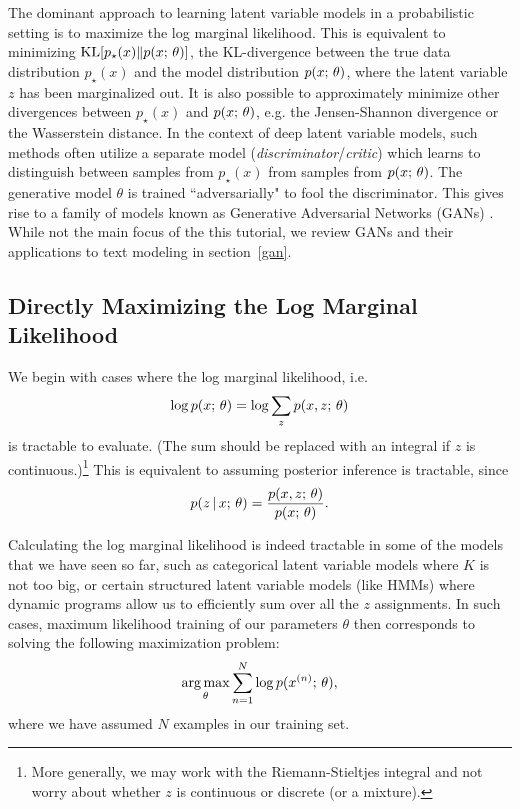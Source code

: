 \documentclass{article}
\begin{document}
The dominant approach to learning latent variable models in a probabilistic setting is to maximize the  log marginal likelihood. This is equivalent to minimizing $\operatorname*{KL}[p_\star(x) \Vert p(x ; \, \theta)]$, the KL-divergence between the
 true data distribution $p_\star(x)$ and the model distribution $p(x ; \, \theta)$, where
 the latent variable $z$ has been marginalized out. It is also possible to approximately minimize other divergences between $p_\star(x )$  and $p(x ; \, \theta)$, e.g. the Jensen-Shannon divergence or the Wasserstein distance.
In the context of deep latent variable models, such methods often utilize a separate model (\textit{discriminator}/\textit{critic}) which
learns to distinguish between samples from $p_\star(x)$ from samples from $p(x ; \, \theta)$. The generative model $\theta$ is trained ``adversarially" to fool the discriminator.
This gives rise to a family of models known as Generative Adversarial Networks (GANs) \citep{goodfellow2014generative}. While not the main
focus of the this tutorial, we review GANs
and their applications to text modeling in section~\ref{gan}.

\subsection{Directly Maximizing the Log Marginal Likelihood} \label{directll}
We begin with cases where the log marginal likelihood,  i.e.
\[ \log p(x ; \, \theta) = \log \sum_z p(x, z ; \, \theta) \]
is tractable to evaluate. (The sum should be replaced with an integral if $z$ is continuous.)\footnote{More generally, we may work with the Riemann-Stieltjes integral and not worry about whether $z$ is continuous or discrete (or a mixture).} This is equivalent to assuming posterior inference is tractable, since 
\[ p(z \,|\, x ; \, \theta) = \frac{p(x, z ; \, \theta)}{p(x ; \, \theta)}. \]

Calculating the log marginal likelihood is indeed tractable in some of the models that we have seen so far, such as categorical latent variable models where $K$ is not too big, or certain structured latent variable models (like HMMs) where dynamic programs allow us to efficiently sum over all the $z$ assignments. In such cases, maximum likelihood training of our parameters $\theta$ then corresponds to solving the following maximization problem:
\[\argmax_{\theta} \sum_{n=1}^N \log p(x^{(n)}; \, \theta), \]
where we have assumed $N$ examples in our training set.
\end{document}

